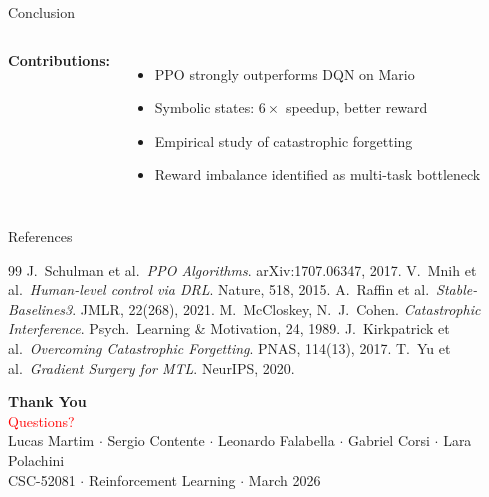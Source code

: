 \documentclass[aspectratio=169, 12pt]{beamer}
\begin{document}
\begin{frame}{Conclusion}
\begin{columns}[T]
\textbf{Contributions:}
\begin{itemize}
  \item PPO strongly outperforms DQN on Mario
  \item Symbolic states: $6\times$ speedup, better reward
  \item Empirical study of catastrophic forgetting
  \item Reward imbalance identified as multi-task bottleneck
\end{itemize}

\end{columns}
\end{frame}

\begin{frame}[allowframebreaks]{References}
\footnotesize
\begin{thebibliography}{99}
 J.~Schulman et al.\ \emph{PPO Algorithms}. arXiv:1707.06347, 2017.
 V.~Mnih et al.\ \emph{Human-level control via DRL}. Nature, 518, 2015.
 A.~Raffin et al.\ \emph{Stable-Baselines3}. JMLR, 22(268), 2021.
 M.~McCloskey, N.~J.~Cohen. \emph{Catastrophic Interference}. Psych.\ Learning \& Motivation, 24, 1989.
 J.~Kirkpatrick et al.\ \emph{Overcoming Catastrophic Forgetting}. PNAS, 114(13), 2017.
 T.~Yu et al.\ \emph{Gradient Surgery for MTL}. NeurIPS, 2020.
\end{thebibliography}
\end{frame}

\begin{frame}
\begin{center}
  \vspace{1cm}
  {\Huge\textbf{Thank You}}\\[12pt]
  {\large\textcolor{red}{Questions?}}\\[20pt]
  {\small Lucas Martim $\cdot$ Sergio Contente $\cdot$ Leonardo Falabella $\cdot$ Gabriel Corsi $\cdot$ Lara Polachini}\\[8pt]
  {\footnotesize CSC-52081 $\cdot$ Reinforcement Learning $\cdot$ March 2026}
\end{center}
\end{frame}
\end{document}
